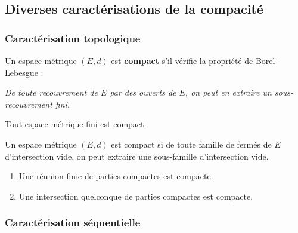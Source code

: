 




  \subsection{Diverses caractérisations de la compacité}

  \subsubsection{Caractérisation topologique}


  \begin{definition}
    Un espace métrique $(E, d)$ est \textbf{compact} s'il vérifie la propriété de Borel-Lebesgue :
    \begin{center}
      \textit{De toute recouvrement de $E$ par des ouverts de $E$, on peut en extraire un sous-recouvrement fini.}
    \end{center}
  \end{definition}

  \begin{example}
    Tout espace métrique fini est compact.
  \end{example}

  \begin{proposition}
    Un espace métrique $(E, d)$ est compact si de toute famille de fermés de $E$ d'intersection vide, on peut extraire une sous-famille d'intersection vide.
  \end{proposition}

  \begin{proposition}
    \begin{enumerate}[label=(\roman*)]
      \item Une réunion finie de parties compactes est compacte.
      \item Une intersection quelconque de parties compactes est compacte.
    \end{enumerate}
  \end{proposition}

  \subsubsection{Caractérisation séquentielle}


